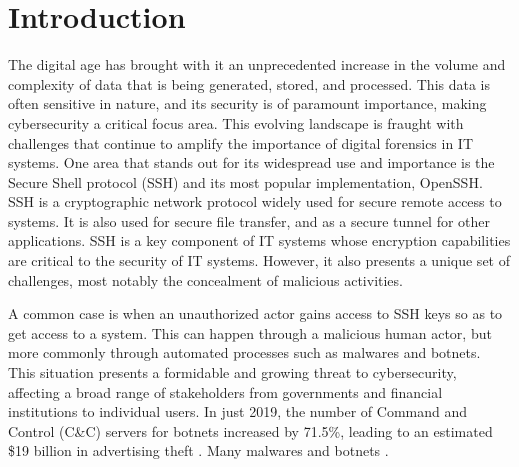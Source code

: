 \chapter{Introduction}\label{chap:introduction}



The digital age has brought with it an unprecedented increase in the volume and complexity of data that is being generated, stored, and processed. This data is often sensitive in nature, and its security is of paramount importance, making cybersecurity a critical focus area. This evolving landscape is fraught with challenges that continue to amplify the importance of digital forensics in IT systems. One area that stands out for its widespread use and importance is the Secure Shell protocol (SSH) and its most popular implementation, OpenSSH. SSH is a cryptographic network protocol widely used for secure remote access to systems. It is also used for secure file transfer, and as a secure tunnel for other applications. SSH is a key component of IT systems whose encryption capabilities are critical to the security of IT systems. However, it also presents a unique set of challenges, most notably the concealment of malicious activities.

A common case is when an unauthorized actor gains access to SSH keys so as to get access to a system. This can happen through a malicious human actor, but more commonly through automated processes such as malwares and botnets. This situation presents a formidable and growing threat to cybersecurity, affecting a broad range of stakeholders from governments and financial institutions to individual users. In just 2019, the number of Command and Control (C\&C) servers for botnets increased by 71.5\%, leading to an estimated \$19 billion in advertising theft \cite{SSHBotnetInfect21}. Many malwares and botnets  \cite{SSHBotnetInfect21}. 

